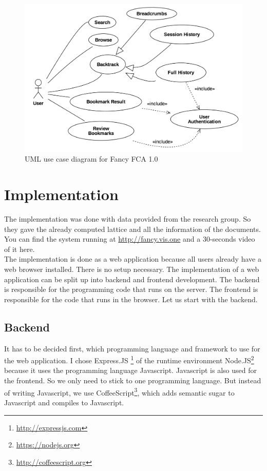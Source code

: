 \documentclass[11pt]{report}
\begin{document}
\begin{figure}[!ht]
	\centering
	\includegraphics[width=\linewidth]{images/usecase}
\caption{UML use case diagram for Fancy FCA 1.0}
\label{figure:usecase}
\end{figure}

\section{Implementation}

The implementation was done with data provided from the research group. So they gave the already computed lattice and all the information of the documents. You can find the system running at \url{http://fancy.vis.one} and a 30-seconds video of it here. \\

The implementation is done as a web application because all users already have a web browser installed. There is no setup necessary. The implementation of a web application can be split up into backend and frontend development. The backend is responsible for the programming code that runs on the server. The frontend is responsible for the code that runs in the browser. Let us start with the backend.

\subsection{Backend}

It has to be decided first, which programming language and framework to use for the web application. I chose Express.JS \footnote{\url{http://expressjs.com}} of the runtime environment Node.JS\footnote{\url{https://nodejs.org}} because it uses the programming language Javascript. Javascript is also used for the frontend. So we only need to stick to one programming language. But instead of writing Javascript, we use CoffeeScript\footnote{\url{http://coffeescript.org}}, which adds semantic sugar to Javascript and compiles to Javascript.\\
\end{document}
